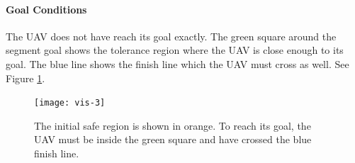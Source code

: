 \paragraph{Goal Conditions} The UAV does not have reach its goal exactly. The green square around the segment goal shows the tolerance region where the UAV is close enough to its goal. The blue line shows the finish line which the UAV must cross as well. See Figure \ref{fig:vis-3}.

\begin{figure}[h]
	\centering
    \texttt{[image: vis-3]}
    \caption[Visualization of the initial safe region and the segment goal conditions]{The initial safe region is shown in orange. To reach its goal, the UAV must be inside the green square and have crossed the blue finish line.}
    \label{fig:vis-3}     
\end{figure}